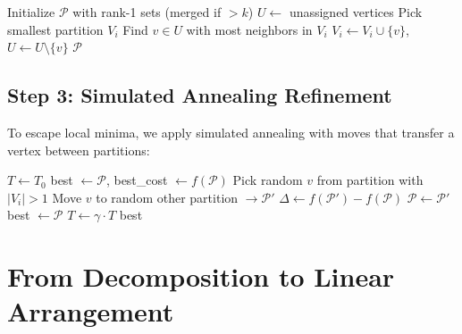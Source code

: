 \documentclass[11pt,a4paper]{article}
\theoremstyle{definition}
\theoremstyle{plain}
\theoremstyle{remark}
\begin{document}
\begin{algorithm}[H]
\caption{Greedy Balanced Partition}
\begin{algorithmic}[1]
  \State Initialize $\mathcal{P}$ with rank-1 sets (merged if $>k$)
  \State $U \gets$ unassigned vertices
    \State Pick smallest partition $V_i$
    \State Find $v \in U$ with most neighbors in $V_i$
    \State $V_i \gets V_i \cup \{v\}$, $U \gets U \setminus \{v\}$
  \EndWhile
  \State \Return $\mathcal{P}$
\EndProcedure
\end{algorithmic}
\end{algorithm}

\subsection{Step 3: Simulated Annealing Refinement}

To escape local minima, we apply simulated annealing with moves that
transfer a vertex between partitions:

\begin{algorithm}[H]
\caption{Simulated Annealing for Joint Optimization}
\begin{algorithmic}[1]
  \State $T \gets T_0$
  \State best $\gets \mathcal{P}$, best\_cost $\gets f(\mathcal{P})$ 
    \State Pick random $v$ from partition with $|V_i| > 1$
    \State Move $v$ to random other partition $\to \mathcal{P}'$
    \State $\Delta \gets f(\mathcal{P}') - f(\mathcal{P})$
      \State $\mathcal{P} \gets \mathcal{P}'$
        \State best $\gets \mathcal{P}$
      \EndIf
    \EndIf
    \State $T \gets \gamma \cdot T$ 
  \EndFor
  \State \Return best
\EndProcedure
\end{algorithmic}
\end{algorithm}

\section{From Decomposition to Linear Arrangement}
\end{document}
